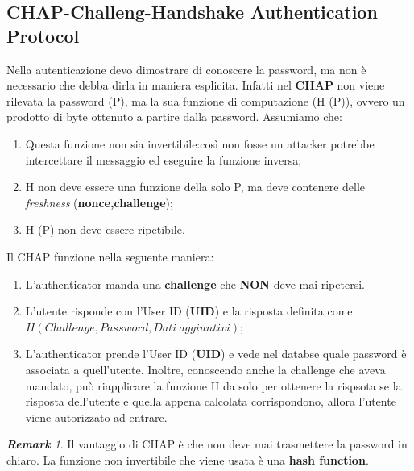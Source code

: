 \documentclass{book}
\theoremstyle{remark}
\newtheorem*{remark}{\textbf{Remark}}
\begin{document}
\subsection{CHAP-Challeng-Handshake Authentication Protocol}
Nella autenticazione devo dimostrare di conoscere la password, ma non è necessario che debba dirla in maniera esplicita\@. Infatti nel \textbf{CHAP} non viene rilevata la password (P), ma la sua funzione di computazione (H (P)), ovvero un prodotto di byte ottenuto a partire dalla password\@. Assumiamo che:\begin{enumerate}
	\item Questa funzione non sia invertibile:\@se così non fosse un attacker potrebbe intercettare il messaggio ed eseguire la funzione inversa;\@
	\item H non deve essere una funzione della solo P, ma deve contenere delle \emph{freshness} (\textbf{nonce,challenge});\@
	\item H (P) non deve essere ripetibile\@.
\end{enumerate}
Il CHAP funzione nella seguente maniera:\begin{enumerate}
	\item L'authenticator manda una \textbf{challenge} che \textbf{NON} deve mai ripetersi\@.
	\item L'utente risponde con l'User ID (\textbf{UID}) e la risposta definita come \(H(Challenge,Password,Dati\ aggiuntivi)\);\@
	\item L'authenticator prende l'User ID (\textbf{UID}) e vede nel databse quale password è associata a quell'utente\@. Inoltre, conoscendo anche la challenge che aveva mandato, può riapplicare la funzione H da solo per ottenere la rispsota se la risposta dell'utente e quella appena calcolata corrispondono, allora l'utente viene autorizzato ad entrare\@.
\end{enumerate}
\begin{remark}
	Il vantaggio di CHAP è che non deve mai trasmettere la password in chiaro\@. La funzione non invertibile che viene usata è una \textbf{hash function}\@.
\end{remark}
\end{document}
